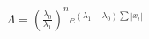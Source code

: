 \documentclass[preview]{standalone}
\begin{document}
\begin{align*}
\Lambda = \left(\frac{\lambda_0}{\lambda_1}\right)^n e^{(\lambda_1-\lambda_0)\sum |x_i|}
\end{align*}
\end{document}
